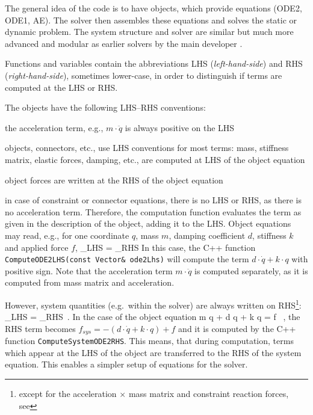 \label{sec:notationSystemOfEOM}
%
The general idea of the code is to have objects, which provide equations (ODE2, ODE1, AE).
The solver then assembles these equations and solves the static or dynamic problem.
The system structure and solver are similar but much more advanced and modular as earlier solvers by the main developer \cite{GerstmayrStangl2004,Gerstmayr2009,GerstmayrEtAl2013}.

 \label{eq_equationLHSRHS}

Functions and variables contain the abbreviations LHS ({\it left-hand-side}) and RHS ({\it right-hand-side}), sometimes lower-case, in order
to distinguish if terms are computed at the LHS or RHS.

The objects have the following LHS--RHS conventions:
\bi
		\item the acceleration term, e.g., $m \cdot \ddot q$ is always positive on the LHS
	  \item objects, connectors, etc., use LHS conventions for most terms: mass, stiffness matrix, elastic forces, damping, etc., are computed at LHS of the object equation
		\item object forces are written at the RHS of the object equation
		\item in case of constraint or connector equations, there is no LHS or RHS, as there is no acceleration term. 
		Therefore, the computation function evaluates the term as given in the description of the object, adding it to the LHS.
\ei
Object equations may read, e.g., for one coordinate $q$, mass $m$, damping coefficient $d$, stiffness $k$ and applied force $f$,
\be
  _{LHS} = _{RHS}
\ee 
In this case, the C++ function \texttt{ComputeODE2LHS(const Vector\& ode2Lhs)} will compute the term
$d \cdot \dot q + k \cdot q$ with positive sign. Note that the acceleration term $m \cdot \ddot q$ is computed separately, as it 
is computed from mass matrix and acceleration.

However, system quantities (e.g.\ within the solver) are always written on RHS\footnote{except for the acceleration $\times$ mass matrix and constraint reaction forces, see }: 
\be 
  _{LHS} = _{RHS} \,.
\ee
In the case of the object equation
\be
  m \cdot \ddot q + d \cdot \dot q + k \cdot q = f \, ,
\ee 
the RHS term becomes $f_{sys} = -(d \cdot \dot q + k \cdot q) + f $ and it is computed by the C++ function \texttt{ComputeSystemODE2RHS}.
%
This means, that during computation, terms which appear at the LHS of the object are transferred to the RHS of the system equation.
This enables a simpler setup of equations for the solver.

